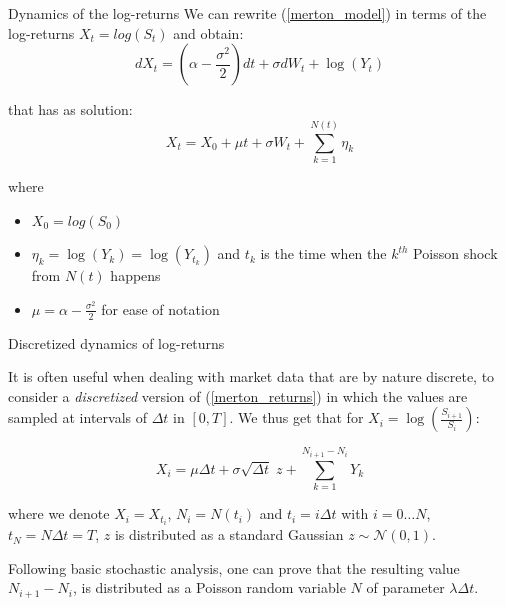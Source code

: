 \documentclass{beamer}
\begin{document}
\begin{frame}{Dynamics of the log-returns}
We can rewrite (\ref{merton_model}) in terms of the log-returns $X_t = log(S_t)$ and obtain:
\begin{equation}
    dX_t = (\alpha - \frac{\sigma^2}{2})dt + \sigma dW_t + \log (Y_t)
\end{equation}

that has as solution:
\begin{equation}
\label{merton_returns}
    X_t =X_0 +  \mu t + \sigma W_t + \sum_{k=1}^{N(t)} \eta_k
\end{equation}

where 
\begin{itemize}
    \item $X_0=log(S_0)$
    \item $\eta_k= \log(Y_k) = \log(Y_{t_k})$ and $t_k$ is the time when the $k^{th}$ Poisson shock from $N(t)$ happens
    \item $\mu = \alpha - \frac{\sigma^2}{2} $ for ease of notation
\end{itemize}

\end{frame}

\begin{frame}{Discretized dynamics of log-returns}

It is often useful when dealing with market data that are by nature discrete, to consider a \textit{discretized} version of (\ref{merton_returns}) in which the values are sampled at intervals of $\Delta t$ in $[0, T]$. We thus get that for $X_i = \log(\frac{S_{i+1}}{S_i})$:

\begin{equation}
\label{discrete_returns}
    X_i =  \mu \Delta t + \sigma \sqrt{\Delta t} \; z +  \sum_{k=1}^{N_{i+1} - N_i} Y_k
\end{equation}

where we denote $X_i = X_{t_i}$, $N_i = N(t_i)$ and $t_i = i \Delta t$ with $i= 0 \dots N$, $t_N = N \Delta t= T$,  $z$ is distributed as a standard Gaussian $ z\sim \mathcal{N}(0,1)$.

 Following basic stochastic analysis, one can prove that the resulting value $N_{i+1} - N_i$,  is distributed as a Poisson random variable $N$ of parameter $\lambda \Delta t$.
\end{frame}
\end{document}
